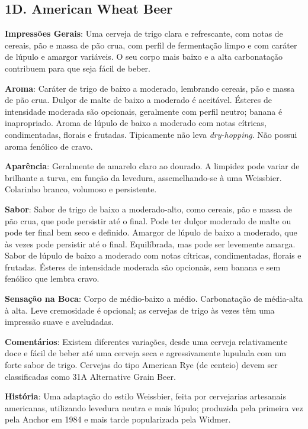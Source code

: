 \subsection*{1D. American Wheat Beer}
\textbf{Impressões Gerais}: Uma cerveja de trigo clara e refrescante, com notas de cereais, pão e massa de pão crua, com perfil de fermentação limpo e com caráter de lúpulo e amargor variáveis. O seu corpo mais baixo e a alta carbonatação contribuem para que seja fácil de beber.

\textbf{Aroma}: Caráter de trigo de baixo a moderado, lembrando cereais, pão e massa de pão crua. Dulçor de malte de baixo a moderado é aceitável. Ésteres de intensidade moderada são opcionais, geralmente com perfil neutro; banana é inapropriado. Aroma de lúpulo de baixo a moderado com notas cítricas, condimentadas, florais e frutadas. Tipicamente não leva \textit{dry-hopping}. Não possui aroma fenólico de cravo.

\textbf{Aparência}: Geralmente de amarelo claro ao dourado. A limpidez pode variar de brilhante a turva, em função da levedura, assemelhando-se à uma Weissbier. Colarinho branco, volumoso e persistente.

\textbf{Sabor}: Sabor de trigo de baixo a moderado-alto, como cereais, pão e massa de pão crua, que pode persistir até o final. Pode ter dulçor moderado de malte ou pode ter final bem seco e definido. Amargor de lúpulo de baixo a moderado, que às vezes pode persistir até o final. Equilíbrada, mas pode ser levemente amarga. Sabor de lúpulo de baixo a moderado com notas cítricas, condimentadas, florais e frutadas. Ésteres de intensidade moderada são opcionais, sem banana e sem fenólico que lembra cravo.

\textbf{Sensação na Boca}: Corpo de médio-baixo a médio. Carbonatação de média-alta à alta. Leve cremosidade é opcional; as cervejas de trigo às vezes têm uma impressão suave e aveludadas.

\textbf{Comentários}: Existem diferentes variações, desde uma cerveja relativamente doce e fácil de beber até uma cerveja seca e agressivamente lupulada com um forte sabor de trigo. Cervejas do tipo American Rye (de centeio) devem ser classificadas como 31A Alternative Grain Beer.

\textbf{História}: Uma adaptação do estilo Weissbier, feita por cervejarias artesanais americanas, utilizando levedura neutra e mais lúpulo; produzida pela primeira vez pela Anchor em 1984 e mais tarde popularizada pela Widmer.

